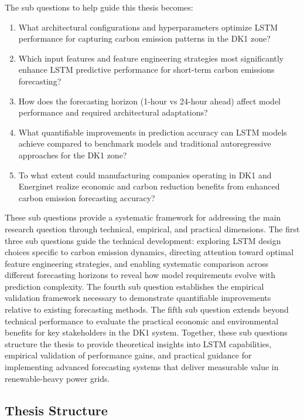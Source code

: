 The sub questions to help guide this thesis becomes:

\begin{enumerate}
    \item What architectural configurations and hyperparameters optimize LSTM performance for capturing carbon emission patterns in the DK1 zone?
    \item Which input features and feature engineering strategies most significantly enhance LSTM predictive performance for short-term carbon emissions forecasting?
    \item How does the forecasting horizon (1-hour vs 24-hour ahead) affect model performance and required architectural adaptations?
    \item What quantifiable improvements in prediction accuracy can LSTM models achieve compared to benchmark models and traditional autoregressive approaches for the DK1 zone?
    \item To what extent could manufacturing companies operating in DK1 and Energinet realize economic and carbon reduction benefits from enhanced carbon emission forecasting accuracy?
\end{enumerate}

These sub questions provide a systematic framework for addressing the main research question through technical, empirical, and practical dimensions. The first three sub questions guide the technical development: exploring LSTM design choices specific to carbon emission dynamics, directing attention toward optimal feature engineering strategies, and enabling systematic comparison across different forecasting horizons to reveal how model requirements evolve with prediction complexity. The fourth sub question establishes the empirical validation framework necessary to demonstrate quantifiable improvements relative to existing forecasting methods. The fifth sub question extends beyond technical performance to evaluate the practical economic and environmental benefits for key stakeholders in the DK1 system. Together, these sub questions structure the thesis to provide theoretical insights into LSTM capabilities, empirical validation of performance gains, and practical guidance for implementing advanced forecasting systems that deliver measurable value in renewable-heavy power grids.

\subsection{Thesis Structure}

